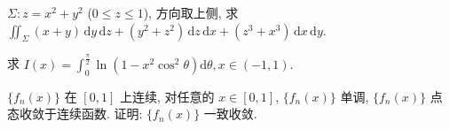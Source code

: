 $\Sigma: z = x^{2} + y^{2}$ ($0 \leq z \leq 1$), 方向取上侧, 求 $\iint_{\Sigma} (x + y) \, \mathrm{d}y \, \mathrm{d}z + (y^{2} + z^{2}) \, \mathrm{d}z \, \mathrm{d}x + (z^{3} + x^{3}) \, \mathrm{d}x \, \mathrm{d}y$.\par
\par{}
求 $I(x) = \int_{0}^{\frac{\pi}{2}}\ln (1 - x^{2}\cos^{2}\theta)\mathrm{d}\theta ,x\in (-1,1).$\par
\par{}
$\{f_n(x)\}$ 在 $[0,1]$ 上连续, 对任意的 $x \in [0,1]$, $\{f_n(x)\}$ 单调, $\{f_n(x)\}$ 点态收敛于连续函数. 证明: $\{f_n(x)\}$ 一致收敛.\par
